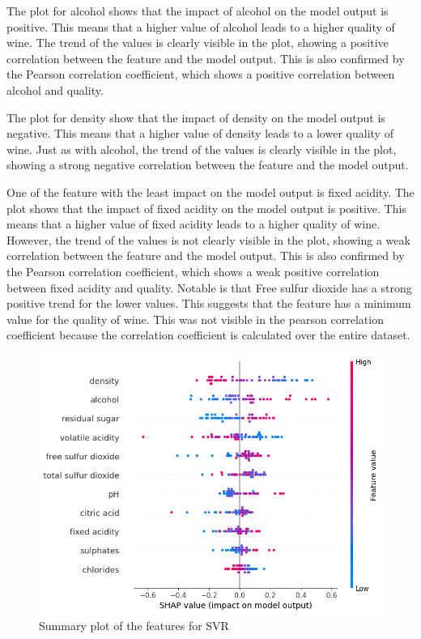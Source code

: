 \documentclass{article}
\begin{document}
The plot for alcohol shows that the impact of alcohol on the model output is positive.
This means that a higher value of alcohol leads to a higher quality of wine.
The trend of the values is clearly visible in the plot, showing a positive correlation between the feature and the model output. %
This is also confirmed by the Pearson correlation coefficient, which shows a positive correlation between alcohol and quality.

The plot for density show that the impact of density on the model output is negative.
This means that a higher value of density leads to a lower quality of wine.
Just as with alcohol, the trend of the values is clearly visible in the plot, showing a strong negative correlation between the feature and the model output.

One of the feature with the least impact on the model output is fixed acidity.
The plot shows that the impact of fixed acidity on the model output is positive.
This means that a higher value of fixed acidity leads to a higher quality of wine.
However, the trend of the values is not clearly visible in the plot, showing a weak correlation between the feature and the model output.
This is also confirmed by the Pearson correlation coefficient, which shows a weak positive correlation between fixed acidity and quality.
Notable is that Free sulfur dioxide has a strong positive trend for the lower values. This suggests that the feature has a minimum value for the quality of wine.
This was not visible in the pearson correlation coefficient because the correlation coefficient is calculated over the entire dataset.

\begin{figure}
	\centering
	\includegraphics[width=\linewidth]{figures/shap-summary-svr.png}
	\caption{Summary plot of the features for SVR}
	\label{fig:summary-plot-svr}
\end{figure}
\end{document}
